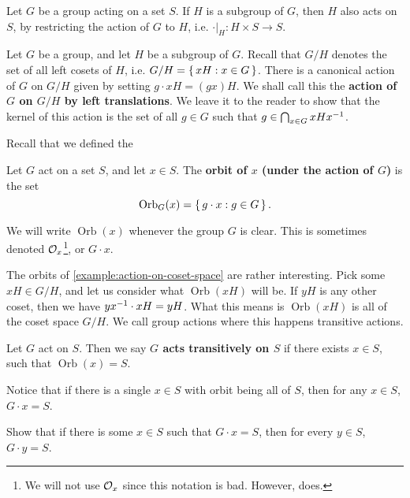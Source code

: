 \documentclass[./main.tex]{subfiles}
\begin{document}
\begin{example}
\label{example:restricting-action}
    Let $G$ be a group acting on a set $S$. If $H$ is a subgroup of $G$, then
    $H$ also acts on $S$, by restricting the action of $G$ to $H$, i.e. $\cdot
    \lvert_H: H \times S \to S$.
\end{example}

\begin{example}
\label{example:action-on-coset-space}
    Let $G$ be a group, and let $H$ be a subgroup of $G$. Recall that $G/H$
    denotes the set of all left cosets of $H$, i.e. $G/H = \set{xH: x \in G}$.
    There is a canonical action of $G$ on $G/H$ given by setting $g \cdot xH =
    (gx)H$. We shall call this the \textbf{action of $G$ on $G/H$ by left
    translations}. We leave it to the reader to show that the kernel of this
    action is the set of all $g \in G$ such that $g \in \bigcap_{x \in G}
    xHx^{-1}$.
\end{example}

Recall that we defined the 
\begin{definition}
    Let $G$ act on a set $S$, and let $x \in S$. The \textbf{orbit of $x$ (under
    the action of $G$)} is the set 
    \[
        \operatorname{Orb}_G(x) = \set{g \cdot x: g \in G}. 
    \]
    
\end{definition}
We will write $\operatorname{Orb}(x)$ whenever the group $G$ is clear. This is
sometimes denoted $\mathcal{O}_x$\footnote{We will not use $\mathcal{O}_x$ since this
notation is bad. However, \autocite{Dummit_Foote_2004} does.}, or $G \cdot x$.

The orbits of \cref{example:action-on-coset-space} are rather interesting. Pick
some $xH \in G/H$, and let us consider what $\operatorname{Orb}(xH)$ will be. If
$yH$ is any other coset, then we have $yx^{-1} \cdot xH = yH$. What this means is
$\operatorname{Orb}(xH)$ is all of the coset space $G/H$. We call group actions
where this happens transitive actions. 

\begin{definition}
    Let $G$ act on $S$. Then we say \textbf{$G$ acts transitively on $S$} if
    there exists $x \in S$, such that $\operatorname{Orb}(x) = S$.
\end{definition}

Notice that if there is a single $x \in S$ with orbit being all of $S$, then for
any $x \in S$, $G \cdot x = S$.
\begin{exercise}
    Show that if there is some $x \in S$ such that $G \cdot x = S$, then for
    every $y \in S$, $G \cdot y = S$.
\end{exercise}
\end{document}
